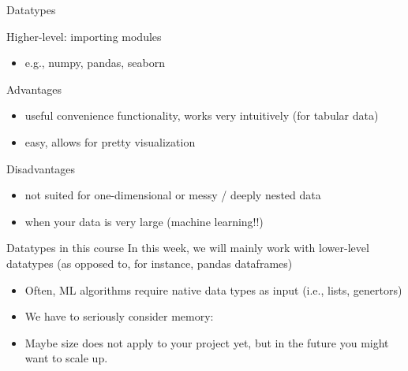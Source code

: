 \documentclass{beamer}
\begin{document}
\begin{frame}{Datatypes}
\begin{block}{Higher-level: importing modules}
	\begin{itemize}[<+->]
		\item e.g., numpy, pandas, seaborn 
	\end{itemize}
\end{block}
\pause
\begin{exampleblock}{Advantages}
	\begin{itemize}[<+->]
		\item useful convenience functionality, works very intuitively (for tabular data)
		\item easy, allows for pretty visualization
	\end{itemize}
\end{exampleblock}
\pause
\begin{alertblock}{Disadvantages }
	\begin{itemize}[<+->]
		\item not suited for one-dimensional or messy / deeply nested data
		\item when your data is very large (machine learning!!)
	\end{itemize}
\end{alertblock}
\end{frame}

\begin{frame}{Datatypes in this course}
In this week, we will mainly work with lower-level datatypes (as opposed to, for instance, pandas dataframes)
\begin{itemize}[<+->]
	\item Often, ML algorithms require native data types as input (i.e., lists, genertors)
	\item We have to seriously consider memory:
	\item Maybe size does not apply to your project yet, but in the future you might want to scale up. 
\end{itemize}	
\end{frame}
\end{document}
